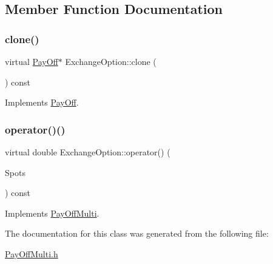 \subsection{Member Function Documentation}
\hypertarget{classExchangeOption_ac780838b87eff5b33af728e5e38c1475}{}\label{classExchangeOption_ac780838b87eff5b33af728e5e38c1475} 
\subsubsection{\texorpdfstring{clone()}{clone()}}
{\footnotesize\ttfamily virtual \hyperlink{classPayOff}{Pay\+Off}$\ast$ Exchange\+Option\+::clone (\begin{DoxyParamCaption}{ }\end{DoxyParamCaption}) const\hspace{0.3cm}{\ttfamily [virtual]}}



Implements \hyperlink{classPayOff_ad8194d5b82247ae89c25c515f0ba806a}{Pay\+Off}.

\hypertarget{classExchangeOption_ae8d49f6d9d482c1e835e3f1c12a1a905}{}\label{classExchangeOption_ae8d49f6d9d482c1e835e3f1c12a1a905} 
\subsubsection{\texorpdfstring{operator()()}{operator()()}}
{\footnotesize\ttfamily virtual double Exchange\+Option\+::operator() (\begin{DoxyParamCaption}\item[{const \hyperlink{classMJArray}{M\+J\+Array} \&}]{Spots }\end{DoxyParamCaption}) const\hspace{0.3cm}{\ttfamily [virtual]}}



Implements \hyperlink{classPayOffMulti_a61039e0c0ee136842b5d6f340b9f8155}{Pay\+Off\+Multi}.



The documentation for this class was generated from the following file\+:\begin{DoxyCompactItemize}
\item 
\hyperlink{PayOffMulti_8h}{Pay\+Off\+Multi.\+h}\end{DoxyCompactItemize}
